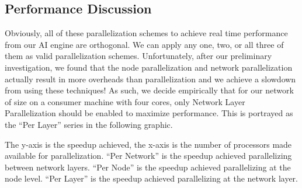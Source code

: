 \subsection*{Performance Discussion}
Obviously, all of these parallelization schemes to achieve real time performance from our AI engine are orthogonal.
We can apply any one, two, or all three of them as valid parallelization schemes.
Unfortunately, after our preliminary investigation, we found that the node parallelization and network parallelization actually result in more overheads than parallelization and we achieve a slowdown from using these techniques!
As such, we decide empirically that for our network of size on a consumer machine with four cores, only Network Layer Parallelization should be enabled to maximize performance.
This is portrayed as the ``Per Layer'' series in the following graphic.

The y-axis is the speedup achieved, the x-axis is the number of processors made available for parallelization.
``Per Network'' is the speedup achieved parallelizing between network layers.
``Per Node'' is the speedup achieved parallelizing at the node level.
``Per Layer'' is the speedup achieved parallelizing at the network layer.

